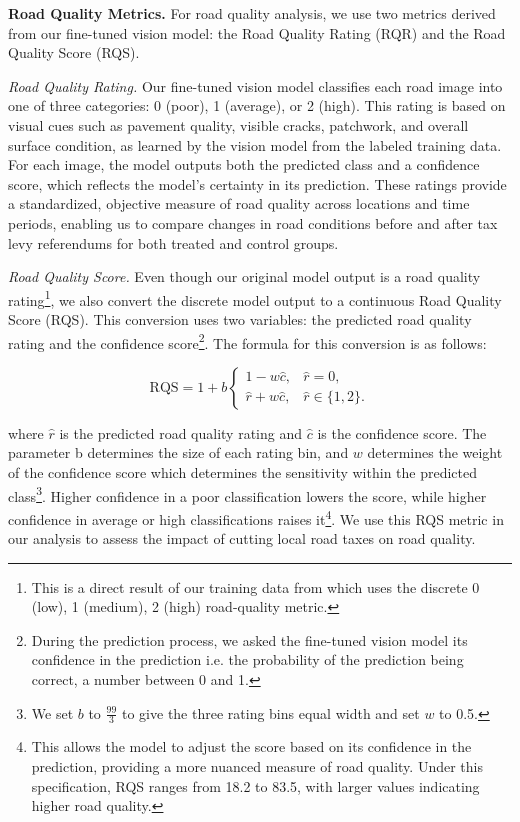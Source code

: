 {\bf Road Quality Metrics.}  For road quality analysis, we use two metrics derived from our fine-tuned vision model: the Road Quality Rating (RQR) and the Road Quality Score (RQS). 

\textit{Road Quality Rating.} Our fine-tuned vision model classifies each road image into one of three categories: 0 (poor), 1 (average), or 2 (high). This rating is based on visual cues such as pavement quality, visible cracks, patchwork, and overall surface condition, as learned by the vision model from the labeled training data. For each image, the model outputs both the predicted class and a confidence score, which reflects the model's certainty in its prediction. These ratings provide a standardized, objective measure of road quality across locations and time periods, enabling us to compare changes in road conditions before and after tax levy referendums for both treated and control groups.

\textit{Road Quality Score.} Even though our original model output is a road quality rating\footnote{This is a direct result of our training data from \cite{brewer2021} which uses the discrete 0 (low), 1 (medium), 2 (high) road-quality metric.}, we also convert the discrete model output to a continuous Road Quality Score (RQS). This conversion uses two variables: the predicted road quality rating and the confidence score\footnote{During the prediction process, we asked the fine-tuned vision model its confidence in the prediction i.e. the probability of the prediction being correct, a number between 0 and 1.}. The formula for this conversion is as follows:

\begin{equation}
\text{RQS} = 1 + b
\begin{cases}
1 - w\hat{c}, & \hat{r}=0,\\
\hat{r} + w\hat{c}, & \hat{r}\in\{1,2\}.
\end{cases}
\label{eq:rqs_formula} 
\end{equation}
 
\noindent 
where $\hat{r}$ is the predicted road quality rating and $\hat{c}$ is the confidence score. The parameter b determines the size of each rating bin, and $w$ determines the weight of the confidence score which determines the sensitivity within the predicted class\footnote{We set $b$ to $\frac{99}{3}$ to give the three rating bins equal width and set $w$ to 0.5.}. Higher confidence in a poor classification lowers the score, while higher confidence in average or high classifications raises it\footnote{This allows the model to adjust the score based on its confidence in the prediction, providing a more nuanced measure of road quality. Under this specification, RQS ranges from 18.2 to 83.5, with larger values indicating higher road quality.}. We use this RQS metric in our analysis to assess the impact of cutting local road taxes on road quality.

